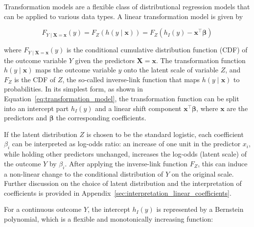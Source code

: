 
Transformation models are a flexible class of distributional regression models that can be applied to various data types. A linear transformation model is given by

\begin{equation}
F_{Y \mid \mathbf{X}=\mathbf{x}}(y) = F_Z(h(y \mid \mathbf{x})) =  F_Z(h_I(y) - \mathbf{x}^\top \boldsymbol{\beta})
\label{eq:transformation_model}
\end{equation}

where $F_{Y \mid \mathbf{X}=\mathbf{x}}(y)$ is the conditional cumulative distribution function (CDF) of the outcome variable $Y$ given the predictors $\mathbf{X}=\mathbf{x}$. The transformation function $h(y \mid \mathbf{x})$ maps the outcome variable $y$ onto the latent scale of variable $Z$, and $F_Z$ is the CDF of $Z$, the so-called inverse-link function that maps $h(y \mid \mathbf{x})$ to probabilities. In its simplest form, as shown in Equation~\ref{eq:transformation_model}, the transformation function can be split into an intercept part $h_I(y)$ and a linear shift component $\mathbf{x}^\top \boldsymbol{\beta}$, where $\mathbf{x}$ are the predictors and $\boldsymbol{\beta}$ the corresponding coefficients.

If the latent distribution $Z$ is chosen to be the standard logistic, each coefficient $\beta_i$ can be interpreted as log-odds ratio: an increase of one unit in the predictor $x_i$, while holding other predictors unchanged, increases the log-odds (latent scale) of the outcome $Y$ by $\beta_i$. After applying the inverse-link function $F_Z$, this can induce a non-linear change to the conditional distribution of $Y$ on the original scale. Further discussion on the choice of latent distribution and the interpretation of coefficients is provided in Appendix~\ref{sec:interpretation_linear_coefficients}.

For a continuous outcome $Y$, the intercept $h_I(y)$ is represented by a Bernstein polynomial, which is a flexible and monotonically increasing function:

